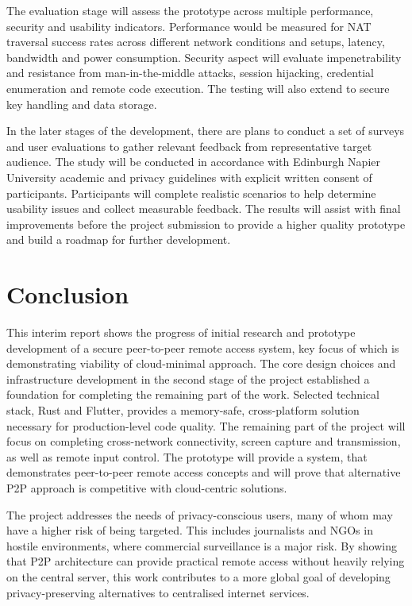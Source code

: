 \documentclass[12pt,a4paper]{article}
\newcommand{\sectionbreak}{\clearpage}
\begin{document}
The evaluation stage will assess the prototype across multiple performance, security and usability indicators. Performance would be measured for NAT traversal success rates across different network conditions and setups, latency, bandwidth and power consumption. Security aspect will evaluate impenetrability and resistance from man-in-the-middle attacks, session hijacking, credential enumeration and remote code execution. The testing will also extend to secure key handling and data storage.

In the later stages of the development, there are plans to conduct a set of surveys and user evaluations to gather relevant feedback from representative target audience. The study will be conducted in accordance with Edinburgh Napier University academic and privacy guidelines with explicit written consent of participants. Participants will complete realistic scenarios to help determine usability issues and collect measurable feedback. The results will assist with final improvements before the project submission to provide a higher quality prototype and build a roadmap for further development.

\section{Conclusion}

This interim report shows the progress of initial research and prototype development of a secure peer-to-peer remote access system, key focus of which is demonstrating viability of cloud-minimal approach. The core design choices and infrastructure development in the second stage of the project established a foundation for completing the remaining part of the work. Selected technical stack, Rust and Flutter, provides a memory-safe, cross-platform solution necessary for production-level code quality. The remaining part of the project will focus on completing cross-network connectivity, screen capture and transmission, as well as remote input control. The prototype will provide a system, that demonstrates peer-to-peer remote access concepts and will prove that alternative P2P approach is competitive with cloud-centric solutions.

The project addresses the needs of privacy-conscious users, many of whom may have a higher risk of being targeted. This includes journalists and NGOs in hostile environments, where commercial surveillance is a major risk. By showing that P2P architecture can provide practical remote access without heavily relying on the central server, this work contributes to a more global goal of developing privacy-preserving alternatives to centralised internet services.

\sectionbreak






\newpage
\end{document}
